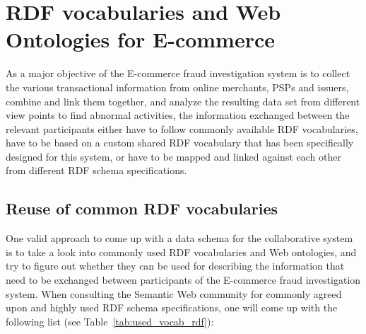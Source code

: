 
\section{\gls{RDF} vocabularies and Web Ontologies for \gls{E-commerce}}
\label{sec:choose_data_schema}

As a major objective of the \gls{E-commerce} fraud investigation system is to collect the various transactional information from online merchants, \gls{PSP}s and issuers, combine and link them together, and analyze the resulting data set from different view points to find abnormal activities, the information exchanged between the relevant participants either have to follow commonly available \gls{RDF} vocabularies, have to be based on a custom shared \gls{RDF} vocabulary that has been specifically designed for this system, or have to be mapped and linked against each other from different \gls{RDF} schema specifications.

\subsection{Reuse of common \gls{RDF} vocabularies}
\label{subsec:reuse_vocab_web}

One valid approach to come up with a data schema for the collaborative system is to take a look into commonly used \gls{RDF} vocabularies and Web ontologies, and try to figure out whether they can be used for describing the information that need to be exchanged between participants of the \gls{E-commerce} fraud investigation system. When consulting the Semantic Web community for commonly agreed upon and highly used \gls{RDF} schema specifications, one will come up with the following list (see Table~\ref{tab:used_vocab_rdf}):\@

